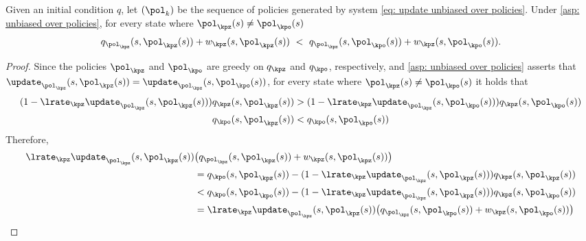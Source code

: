 \begin{lemma}
\label{thm: expected policy improvement}
Given an initial condition $q$, let $(\pol_k)$ be the sequence of policies generated by system \eqref{eq: update unbiased over policies}.
Under \autoref{asp: unbiased over policies},
for every state where $\pol_\kpz(s) \neq \pol_\kpo(s)$
\begin{align} 
    q_{\pol_\kpz}(s, \pol_\kpz(s)) + w_\kpz(s, \pol_\kpz(s))
    \ < \
    q_{\pol_\kpz}(s, \pol_\kpo(s)) + w_\kpz(s, \pol_\kpo(s)).
\end{align}
\end{lemma}

\begin{proof}

Since the policies $\pol_\kpz$ and $\pol_\kpo$ are greedy on $q_\kpz$ and $q_\kpo$, respectively, 
and \autoref{asp: unbiased over policies} asserts that 
$\update_{\pol_\kpz}(s, \pol_\kpz(s)) = \update_{\pol_\kpz}(s, \pol_\kpo(s))$, 
for every state where $\pol_\kpz(s) \neq \pol_\kpo(s)$ it holds that
\begin{align*}
    (1 - \lrate_\kpz \update_{\pol_\kpz}(s, \pol_\kpz(s))) q_\kpz(s, \pol_\kpz(s)) &> (1 - \lrate_\kpz \update_{\pol_\kpz}(s, \pol_\kpo(s))) q_\kpz(s, \pol_\kpo(s)) 
    \\
    q_\kpo(s, \pol_\kpz(s)) &< q_\kpo(s, \pol_\kpo(s))
    \\
\end{align*}
Therefore,
\begin{align*}
    \lrate_\kpz \update_{\pol_\kpz}(s, \pol_\kpz(s)) &\big( q_{\pol_\kpz}(s, \pol_\kpz(s)) + w_\kpz(s, \pol_\kpz(s)) \big)
    \\&= q_\kpo(s, \pol_\kpz(s)) - (1 - \lrate_\kpz \update_{\pol_\kpz}(s, \pol_\kpz(s))) q_\kpz(s, \pol_\kpz(s))
    \\
    &< q_\kpo(s, \pol_\kpo(s)) - (1 - \lrate_\kpz \update_{\pol_\kpz}(s, \pol_\kpz(s))) q_\kpz(s, \pol_\kpo(s))
    \\
    &= \lrate_\kpz \update_{\pol_\kpz}(s, \pol_\kpz(s)) \big( q_{\pol_\kpz}(s, \pol_\kpo(s)) + w_\kpz(s, \pol_\kpo(s)) \big)
\end{align*}


\end{proof}
